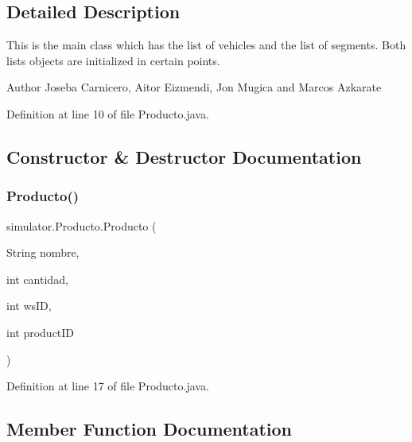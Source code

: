\subsection{Detailed Description}
This is the main class which has the list of vehicles and the list of segments. Both lists objects are initialized in certain points.

\begin{DoxyAuthor}{Author}
Joseba Carnicero, Aitor Eizmendi, Jon Mugica and Marcos Azkarate 
\end{DoxyAuthor}


Definition at line 10 of file Producto.\+java.



\subsection{Constructor \& Destructor Documentation}
\mbox{\label{classsimulator_1_1_producto_a8ed98f559ef18c7681a41daf22397ee4}} 
\subsubsection{\texorpdfstring{Producto()}{Producto()}}
{\footnotesize\ttfamily simulator.\+Producto.\+Producto (\begin{DoxyParamCaption}\item[{String}]{nombre,  }\item[{int}]{cantidad,  }\item[{int}]{ws\+ID,  }\item[{int}]{product\+ID }\end{DoxyParamCaption})}



Definition at line 17 of file Producto.\+java.



\subsection{Member Function Documentation}
\mbox{\label{classsimulator_1_1_producto_af5946c71fa4afa0a7d2040c7aa8e080e}} 
